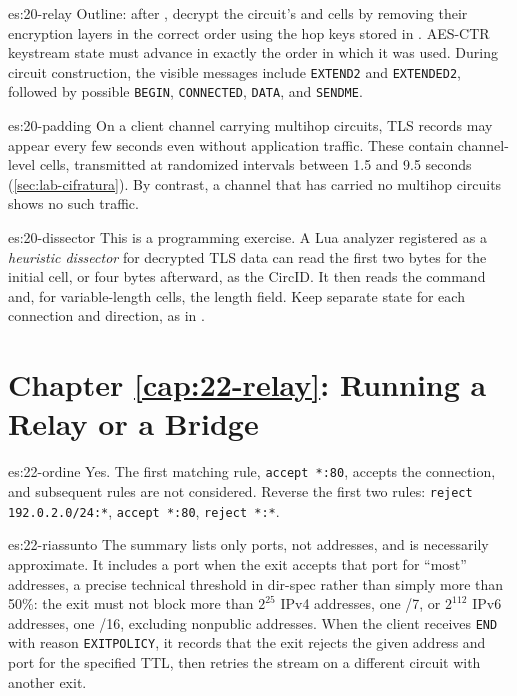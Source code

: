 \begin{soluzione}{es:20-relay}
Outline: after , decrypt the circuit's  and  cells by removing their encryption layers in the correct order using the hop keys stored in . AES-CTR keystream state must advance in exactly the order in which it was used. During circuit construction, the visible messages include \texttt{EXTEND2} and \texttt{EXTENDED2}, followed by possible \texttt{BEGIN}, \texttt{CONNECTED}, \texttt{DATA}, and \texttt{SENDME}.
\end{soluzione}

\begin{soluzione}{es:20-padding}
On a client channel carrying multihop circuits, TLS records may appear every few seconds even without application traffic. These contain channel-level  cells, transmitted at randomized intervals between 1.5 and 9.5 seconds (\cref{sec:lab-cifratura}). By contrast, a channel that has carried no multihop circuits shows no such traffic.
\end{soluzione}

\begin{soluzione}{es:20-dissector}
This is a programming exercise. A Lua analyzer registered as a \emph{heuristic dissector} for decrypted TLS data can read the first two bytes for the initial  cell, or four bytes afterward, as the CircID. It then reads the command and, for variable-length cells, the length field. Keep separate state for each connection and direction, as in .
\end{soluzione}

\section*{Chapter \ref{cap:22-relay}: Running a Relay or a Bridge}

\begin{soluzione}{es:22-ordine}
Yes. The first matching rule, \texttt{accept *:80}, accepts the connection, and subsequent rules are not considered. Reverse the first two rules: \texttt{reject 192.0.2.0/24:*}, \texttt{accept *:80}, \texttt{reject *:*}.
\end{soluzione}

\begin{soluzione}{es:22-riassunto}
The summary lists only ports, not addresses, and is necessarily approximate. It includes a port when the exit accepts that port for \enquote{most} addresses, a precise technical threshold in dir-spec rather than simply more than 50\%: the exit must not block more than $2^{25}$ IPv4 addresses, one /7, or $2^{112}$ IPv6 addresses, one /16, excluding nonpublic addresses. When the client receives \texttt{END} with reason \texttt{EXITPOLICY}, it records that the exit rejects the given address and port for the specified TTL, then retries the stream on a different circuit with another exit.
\end{soluzione}


